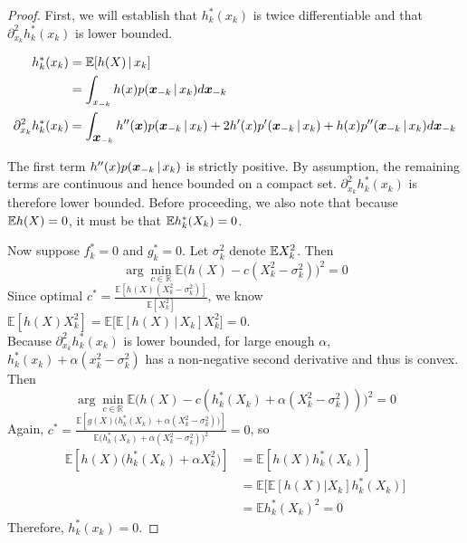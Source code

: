 \begin{proof}


First, we will establish that $h^*_k(x_k)$ is twice differentiable and that $\partial^2_{x_k} h^*_k(x_k)$ is lower bounded. 

\begin{align*}
h^*_k(x_k) &= {\mathbb E}[ h(X) {\,|\,} x_k] \\
  &= \int_{x_{-k}} h(x) p(\mbox{\boldmath $x$}_{-k} {\,|\,} x_k) d \mbox{\boldmath $x$}_{-k}\\
\partial^2_{x_k} h^*_k(x_k) 
  &= \int_{\mbox{\boldmath $x$}_{-k}} h''(\mbox{\boldmath $x$}) p(\mbox{\boldmath $x$}_{-k} {\,|\,} x_k) +
  2 h'(x) p'(\mbox{\boldmath $x$}_{-k} {\,|\,} x_k) + h(x) p''(\mbox{\boldmath $x$}_{-k} {\,|\,} x_k) 
  d\mbox{\boldmath $x$}_{-k} 
\end{align*}

The first term $h''(x) p(\mbox{\boldmath $x$}_{-k} {\,|\,} x_k)$ is strictly positive. By assumption, the remaining terms are continuous and hence bounded on a compact set. $\partial^2_{x_k} h^*_k(x_k)$ is therefore lower bounded. Before proceeding, we also note that because ${\mathbb E} h(X) = 0$, it must be that ${\mathbb E} h^*_k(X_k) = 0$.

Now suppose $f^*_k = 0$ and $g^*_k = 0$. Let $\sigma_k^2$ denote ${\mathbb E} X_k^2$. Then 
\[
\arg\min_{c \in \mathbb{R}} \mathbb{E}\Big( h(X) - c (X_k^2-\sigma_k^2) \Big)^2 = 0
\]
Since optimal $c^* = \frac{\mathbb{E} [ h(X) (X_k^2-\sigma_k^2) ]}{\mathbb{E}[ X_k^2 ]}$, 
we know $\mathbb{E} [ h(X) X_k^2 ] = 
\mathbb{E} \Big[ \mathbb{E}[ h(X) \,|\, X_k] X_k^2 \Big] = 0$.\\

Because $\partial^2_{x_k} h^*_k(x_k)$ is lower bounded, for large enough $\alpha$, $h^*_k(x_k) + \alpha (x_k^2 - \sigma_k^2)$ has a non-negative second derivative and thus is convex. Then
\[
\arg\min_{c \in \mathbb{R}} \mathbb{E}\Big( h(X) 
       - c (h^*_k(X_k) + \alpha (X_k^2 - \sigma_k^2)) \Big)^2 = 0
\]
Again, $c^* = \frac{\mathbb{E}[g(X)\big( 
            h^*_k(X_k) + \alpha (X_k^2 - \sigma_k^2) \big)]}{\mathbb{E}
        \big( h^*_k(X_k) + \alpha (X_k^2 - \sigma_k^2) \big)^2} = 0$, so
\begin{align*}
\mathbb{E}[ h(X) \big( h^*_k(X_k) + \alpha X_k^2 \big) ] &= 
\mathbb{E}[ h(X) h^*_k(X_k) ] \\
& = \mathbb{E}\Big[ \mathbb{E}[h(X) | X_k]  h^*_k(X_k) \Big] \\
& = \mathbb{E} h^*_k(X_k)^2 = 0
\end{align*}
Therefore, $h^*_k(x_k) = 0$.

\end{proof}


